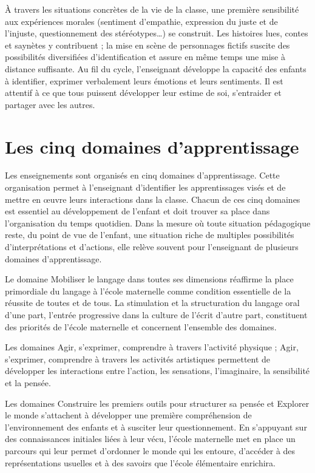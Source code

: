 À travers les situations concrètes de la vie de la classe, une première sensibilité aux expériences morales (sentiment d’empathie, expression du juste et de l’injuste, questionnement des stéréotypes\dots) se construit. Les histoires lues, contes et saynètes y contribuent ; la mise en scène de personnages fictifs suscite des possibilités diversifiées d’identification et assure en même temps une mise à distance suffisante. Au fil du cycle, l’enseignant développe la capacité des enfants à identifier, exprimer verbalement leurs émotions et leurs sentiments. Il est attentif à ce que tous puissent développer leur estime de soi, s’entraider et partager avec les autres.

\part{Les cinq domaines d’apprentissage}
Les enseignements sont organisés en cinq domaines d’apprentissage. Cette organisation permet à l’enseignant d’identifier les apprentissages visés et de mettre en œuvre leurs interactions dans la classe. Chacun de ces cinq domaines est essentiel au développement de l’enfant et doit trouver sa place dans l’organisation du temps quotidien. Dans la mesure où toute situation pédagogique reste, du point de vue de l’enfant, une situation riche de multiples possibilités d’interprétations et d’actions, elle relève souvent pour l’enseignant de plusieurs domaines d’apprentissage.

Le domaine \og Mobiliser le langage dans toutes ses dimensions \fg{} réaffirme la place primordiale du langage à l’école maternelle comme condition essentielle de la réussite de toutes et de tous. La stimulation et la structuration du langage oral d’une part, l’entrée progressive dans la culture de l’écrit d’autre part, constituent des priorités de l’école maternelle et concernent l’ensemble des domaines. 

Les domaines  \og Agir, s’exprimer, comprendre à travers l’activité physique \fg{} ; \og Agir, s’exprimer, comprendre à travers les activités artistiques \fg{} permettent de développer les interactions entre l’action, les sensations, l’imaginaire, la sensibilité et la pensée. 

Les domaines \og Construire les premiers outils pour structurer sa pensée \fg{} et \og Explorer le monde \fg{} s’attachent à développer une première compréhension de l’environnement des enfants et à susciter leur questionnement. En s’appuyant sur des connaissances initiales liées à leur vécu, l’école maternelle met en place un parcours qui leur permet d’ordonner le monde qui les entoure, d’accéder à des représentations usuelles et à des savoirs que l’école élémentaire enrichira. 

